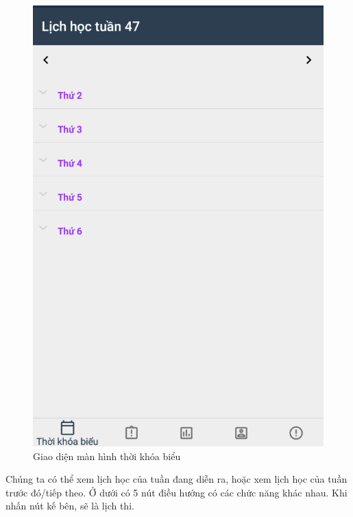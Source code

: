 \documentclass[a4paper]{article}
\begin{document}
\begin{figure}[H]
    \centering
    \includegraphics[scale=.3]{scheduler_ui.png}
    \caption{Giao diện màn hình thời khóa biểu}
\end{figure}
Chúng ta có thể xem lịch học của tuần đang diễn ra, hoặc xem lịch học của tuần trước đó/tiếp theo. Ở dưới có 5 nút điều hướng có các chức năng khác nhau. Khi nhấn nút kế bên, sẽ là lịch thi.
\end{document}
